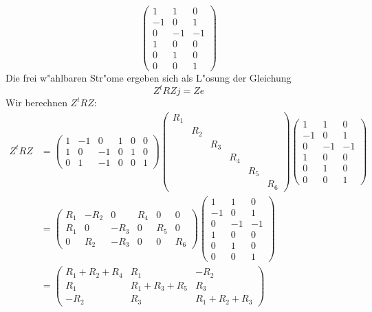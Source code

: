 \begin{loesung}
\begin{teilaufgaben}
\[\begin{pmatrix}
 1& 1& 0\\
-1& 0& 1\\
 0&-1&-1\\
 1& 0& 0\\
 0& 1& 0\\
 0& 0& 1
\end{pmatrix}
\]
Die frei w"ahlbaren Str"ome ergeben sich als L"osung der
Gleichung
\[
Z^tRZj=Ze
\]
Wir berechnen $Z^tRZ$:
\begin{align*}
Z^tRZ&=
\begin{pmatrix}
   1& -1&  0&  1&  0&  0\\
   1&  0& -1&  0&  1&  0\\
   0&  1& -1&  0&  0&  1
\end{pmatrix}
\begin{pmatrix}
R_1&   &   &   &   &   \\
   &R_2&   &   &   &   \\
   &   &R_3&   &   &   \\
   &   &   &R_4&   &   \\
   &   &   &   &R_5&   \\
   &   &   &   &   &R_6
\end{pmatrix}
\begin{pmatrix}
 1& 1& 0\\
-1& 0& 1\\
 0&-1&-1\\
 1& 0& 0\\
 0& 1& 0\\
 0& 0& 1
\end{pmatrix}
\\
&=
\begin{pmatrix}
 R_1&-R_2&   0& R_4&   0&   0\\
 R_1&   0&-R_3&   0& R_5&   0\\
   0& R_2&-R_3&   0&   0& R_6
\end{pmatrix}
\begin{pmatrix}
 1& 1& 0\\
-1& 0& 1\\
 0&-1&-1\\
 1& 0& 0\\
 0& 1& 0\\
 0& 0& 1
\end{pmatrix}
\\
&=
\begin{pmatrix}
R_1+R_2+R_4&R_1&-R_2\\
R_1&R_1+R_3+R_5&R_3\\
-R_2&R_3&R_1+R_2+R_3
\end{pmatrix}

\end{align*}
\end{teilaufgaben}
\end{loesung}
